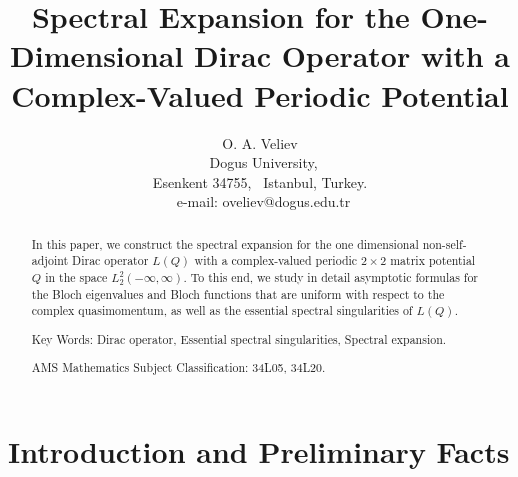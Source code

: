 \documentclass{article}%
\begin{document}
\title{Spectral Expansion for the One-Dimensional Dirac Operator with a
Complex-Valued Periodic Potential}
\author{O. A. Veliev\\{\small \ Dogus University, }\\{\small Esenkent 34755, \ Istanbul, Turkey.}\\\ {\small e-mail: oveliev@dogus.edu.tr}}
\date{}
\maketitle

\begin{abstract}
In this paper, we construct the spectral expansion for the one dimensional
non-self-adjoint Dirac operator $L(Q)$ with a complex-valued periodic
$2\times2$ matrix potential $Q$ in the space $L_{2}^{2}(-\infty,\infty)$. To
this end, we study in detail asymptotic formulas for the Bloch eigenvalues and
Bloch functions that are uniform with respect to the complex quasimomentum, as
well as the essential spectral singularities of $L(Q)$.

Key Words: Dirac operator, Essential spectral singularities, Spectral expansion.

AMS Mathematics Subject Classification: 34L05, 34L20.

\end{abstract}

\section{ Introduction and Preliminary Facts}
\end{document}
